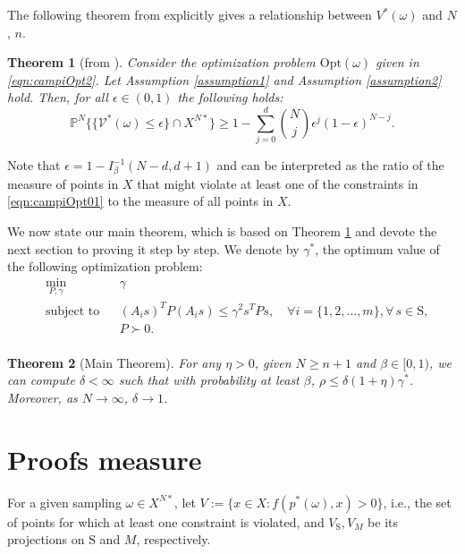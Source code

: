 \documentclass[letterpaper, 10 pt, conference]{ieeeconf}  %
\newcommand{\Opt}{\text{Opt} }
\newcommand{\sphere}{\text{S}}
\newcommand{\calV}{\mathcal{V}}
\newtheorem{theorem}{Theorem}[section]
\begin{document}
The following theorem from \cite{campi} explicitly gives a relationship between $V^*(\omega)$ and $N$, $n$.
\begin{theorem}[from \cite{campi}]\label{thm:campi}Consider the optimization problem $\Opt(\omega)$ given in \eqref{eqn:campiOpt2}. Let Assumption \ref{assumption1} and Assumption \ref{assumption2} hold. Then, for all $\epsilon \in (0,1)$ the following holds:
\begin{equation*}\mathbb{P}^N\{\{\calV^*(\omega) \leq \epsilon\} \cap X^{N*}\} \geq 1- \sum_{j=0}^{d} \binom{N}{j}\epsilon^j (1-\epsilon)^{N-j}.\end{equation*}
\end{theorem}

Note that $\epsilon=1-I_{\beta}^{-1}(N-d, d+1)$ and can be interpreted as the ratio of the measure of points in $X$ that might violate at least one of the constraints in \eqref{eqn:campiOpt01} to the measure of all points in $X$.

We now state our main theorem, which is based on Theorem \ref{thm:campi} and devote the next section to proving it step by step. We denote by $\gamma^*$, the optimum value of the following optimization problem:
\begin{equation}
\begin{aligned}
& \min_{P, \gamma} & & \gamma \\
& \text{subject to} 
&  & (A_is)^TP(A_is) \leq \gamma^2 s^TPs, \quad \forall i = \{1,2, \ldots, m\},  \forall\, s \in \sphere,\\
& && P \succ 0. \\
\end{aligned}
\end{equation}

\begin{theorem}[Main Theorem] \label{thm:mainTheorem} For any $\eta > 0$, given $N \geq n+1$ and $\beta \in [0,1)$, we can compute $\delta < \infty$ such that with probability at least $\beta$, $\rho \leq \delta (1 + \eta) \gamma^*$. Moreover, as $N \to \infty$, $\delta \to 1$.
\end{theorem}

\section{Proofs measure}

For a given sampling $\omega \in X^{N*}$, let $V:=\{x \in X: f(p^*(\omega),x) > 0\}$, i.e., the set of points for which at least one constraint is violated, and $V_\sphere, V_M$ be its projections on $\sphere$ and $M$, respectively. 
\end{document}
